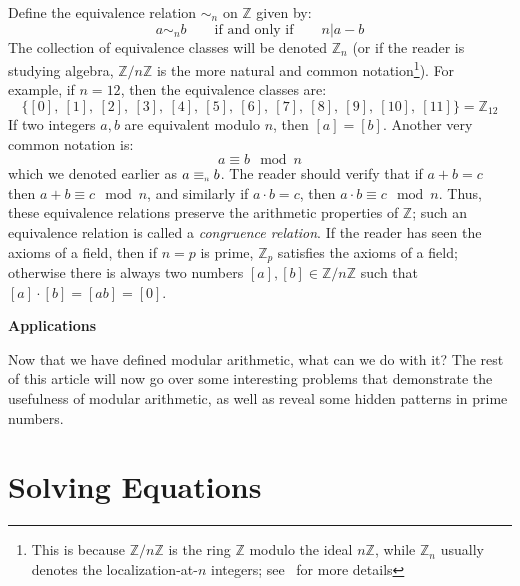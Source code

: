 \documentclass{article}
\newcommand{\chapter}[1]{%
  \clearpage
  \vspace*{30pt} %
  {\normalfont\huge\bfseries #1\par} %
  \vspace{20pt} %
}
\newcommand\scalemath[2]{\scalebox{#1}{\mbox{\ensuremath{\displaystyle #2}}}}
\newcommand{\Equiv}[1]{\equiv_{\scalemath{0.6}{#1}}}
\newcommand{\Z}{\mathbb{Z}}
\renewcommand{\mid}{\big|}
\begin{document}
Define the equivalence relation $\sim_n$ on $\Z$ given by:
\[
  a\sim_n b \qquad \text{if and only if} \qquad n\mid a-b
\]
The collection of equivalence classes will be denoted $\Z_n$ (or if the reader is studying algebra, $\Z/n\Z$
is the more natural and common notation\footnote{This is because $\Z/n\Z$ is the ring $\Z$ modulo the ideal $n\Z$,
while $\Z_n$ usually denotes the localization-at-$n$ integers; see~\cite[chapter~9,
chapter~20.3]{NateAlgebra} for more details}). For example, if $n = 12$, then the equivalence classes are:
\[
  \{[0],\ [1],\ [2],\ [3],\ [4],\ [5],\ [6],\ [7],\ [8],\ [9],\ [10],\ [11]\} = \Z_{12}
\]
If two integers $a,b$ are equivalent modulo $n$, then $[a] = [b]$. Another very common notation is:
\[
  a\equiv b\mod n
\]
which we denoted earlier as $a\Equiv{n} b$. The reader should verify that if $a+b = c$ then $a+b\equiv c \mod
n$, and similarly if $a\cdot b = c$, then $a\cdot b \equiv c \mod n$. Thus, these equivalence relations
preserve the arithmetic properties of $\Z$; such an equivalence relation is called a \emph{congruence
relation}. If the reader has seen the axioms of a field, then if $n=p$ is prime, $\Z_p$ satisfies the axioms
of a field; otherwise there is always two numbers $[a],[b] \in \Z/n\Z$ such that $[a]\cdot[b] = [ab] = [0]$.





\newpage
\chapter{Applications}

Now that we have defined modular arithmetic, what can we do with it? The rest of this article will now go
over some interesting problems that demonstrate the usefulness of modular arithmetic, as well as reveal some
hidden patterns in prime numbers.

\section{Solving Equations}
\end{document}
